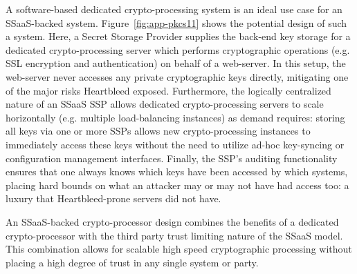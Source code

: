 A software-based dedicated crypto-processing system is an ideal use
case for an SSaaS-backed system. Figure~\ref{fig:app-pkcs11} shows the
potential design of such a system. Here, a Secret Storage Provider
supplies the back-end key storage for a dedicated crypto-processing
server which performs cryptographic operations (e.g. SSL encryption
and authentication) on behalf of a web-server. In this setup, the
web-server never accesses any private cryptographic keys directly,
mitigating one of the major risks Heartbleed exposed. Furthermore, the
logically centralized nature of an SSaaS SSP allows dedicated
crypto-processing servers to scale horizontally (e.g. multiple
load-balancing instances) as demand requires: storing all keys via one
or more SSPs allows new crypto-processing instances to immediately
access these keys without the need to utilize ad-hoc key-syncing or
configuration management interfaces. Finally, the SSP's auditing
functionality ensures that one always knows which keys have been
accessed by which systems, placing hard bounds on what an attacker may
or may not have had access too: a luxury that Heartbleed-prone servers
did not have.

An SSaaS-backed crypto-processor design combines the benefits of a
dedicated crypto-processor with the third party trust limiting nature
of the SSaaS model. This combination allows for scalable high speed
cryptographic processing without placing a high degree of trust in any
single system or party.

